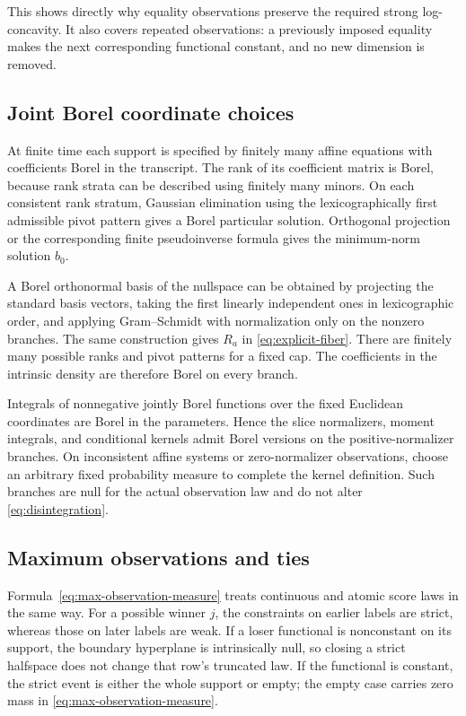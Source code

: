 \documentclass[11pt]{article}
\numberwithin{equation}{section}
\theoremstyle{definition}
\theoremstyle{remark}
\begin{document}
This shows directly why equality observations preserve the required strong log-concavity. It also covers repeated observations: a previously imposed equality makes the next corresponding functional constant, and no new dimension is removed.

\subsection{Joint Borel coordinate choices}

At finite time each support is specified by finitely many affine equations with coefficients Borel in the transcript. The rank of its coefficient matrix is Borel, because rank strata can be described using finitely many minors. On each consistent rank stratum, Gaussian elimination using the lexicographically first admissible pivot pattern gives a Borel particular solution. Orthogonal projection or the corresponding finite pseudoinverse formula gives the minimum-norm solution $b_0$.

A Borel orthonormal basis of the nullspace can be obtained by projecting the standard basis vectors, taking the first linearly independent ones in lexicographic order, and applying Gram--Schmidt with normalization only on the nonzero branches. The same construction gives $R_a$ in \eqref{eq:explicit-fiber}. There are finitely many possible ranks and pivot patterns for a fixed cap. The coefficients in the intrinsic density are therefore Borel on every branch.

Integrals of nonnegative jointly Borel functions over the fixed Euclidean coordinates are Borel in the parameters. Hence the slice normalizers, moment integrals, and conditional kernels admit Borel versions on the positive-normalizer branches. On inconsistent affine systems or zero-normalizer observations, choose an arbitrary fixed probability measure to complete the kernel definition. Such branches are null for the actual observation law and do not alter \eqref{eq:disintegration}.

\subsection{Maximum observations and ties}

Formula~\eqref{eq:max-observation-measure} treats continuous and atomic score laws in the same way. For a possible winner $j$, the constraints on earlier labels are strict, whereas those on later labels are weak. If a loser functional is nonconstant on its support, the boundary hyperplane is intrinsically null, so closing a strict halfspace does not change that row's truncated law. If the functional is constant, the strict event is either the whole support or empty; the empty case carries zero mass in \eqref{eq:max-observation-measure}.
\end{document}
